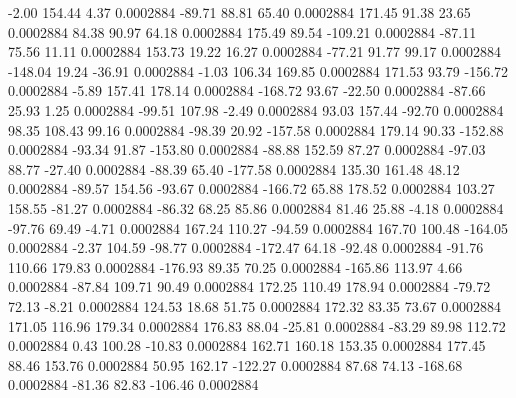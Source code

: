        -2.00      154.44        4.37     0.0002884
      -89.71       88.81       65.40     0.0002884
      171.45       91.38       23.65     0.0002884
       84.38       90.97       64.18     0.0002884
      175.49       89.54     -109.21     0.0002884
      -87.11       75.56       11.11     0.0002884
      153.73       19.22       16.27     0.0002884
      -77.21       91.77       99.17     0.0002884
     -148.04       19.24      -36.91     0.0002884
       -1.03      106.34      169.85     0.0002884
      171.53       93.79     -156.72     0.0002884
       -5.89      157.41      178.14     0.0002884
     -168.72       93.67      -22.50     0.0002884
      -87.66       25.93        1.25     0.0002884
      -99.51      107.98       -2.49     0.0002884
       93.03      157.44      -92.70     0.0002884
       98.35      108.43       99.16     0.0002884
      -98.39       20.92     -157.58     0.0002884
      179.14       90.33     -152.88     0.0002884
      -93.34       91.87     -153.80     0.0002884
      -88.88      152.59       87.27     0.0002884
      -97.03       88.77      -27.40     0.0002884
      -88.39       65.40     -177.58     0.0002884
      135.30      161.48       48.12     0.0002884
      -89.57      154.56      -93.67     0.0002884
     -166.72       65.88      178.52     0.0002884
      103.27      158.55      -81.27     0.0002884
      -86.32       68.25       85.86     0.0002884
       81.46       25.88       -4.18     0.0002884
      -97.76       69.49       -4.71     0.0002884
      167.24      110.27      -94.59     0.0002884
      167.70      100.48     -164.05     0.0002884
       -2.37      104.59      -98.77     0.0002884
     -172.47       64.18      -92.48     0.0002884
      -91.76      110.66      179.83     0.0002884
     -176.93       89.35       70.25     0.0002884
     -165.86      113.97        4.66     0.0002884
      -87.84      109.71       90.49     0.0002884
      172.25      110.49      178.94     0.0002884
      -79.72       72.13       -8.21     0.0002884
      124.53       18.68       51.75     0.0002884
      172.32       83.35       73.67     0.0002884
      171.05      116.96      179.34     0.0002884
      176.83       88.04      -25.81     0.0002884
      -83.29       89.98      112.72     0.0002884
        0.43      100.28      -10.83     0.0002884
      162.71      160.18      153.35     0.0002884
      177.45       88.46      153.76     0.0002884
       50.95      162.17     -122.27     0.0002884
       87.68       74.13     -168.68     0.0002884
      -81.36       82.83     -106.46     0.0002884

